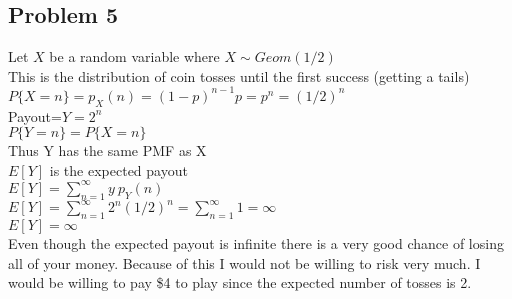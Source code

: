 \documentclass{article}
\begin{document}
\begin{flushleft}
\section*{Problem 5}
Let $X$ be a random variable where $X \sim Geom(1/2)$\\
This is the distribution of coin tosses until the first success (getting a tails)\\
$P\{X=n\}=p_X(n)=(1-p)^{n-1}p=p^n=(1/2)^n$\\
Payout=$Y=2^n$\\
$P\{Y=n\}=P\{X=n\}$\\
Thus Y has the same PMF as X\\
$E[Y]$ is the expected payout\\
$E[Y]=\sum_{n=1}^{\infty}y \ p_Y(n)$ \\ $E[Y]=\sum_{n=1}^{\infty}2^n(1/2)^n=\sum_{n=1}^{\infty}1
=\infty$\\
$E[Y]=\infty$\\
Even though the expected payout is infinite there is a very good chance of losing all of your money. Because of this I would not be willing to risk very much. I would be willing to pay \$4 to play since the expected number of tosses is 2.
\pagebreak

\end{flushleft}
\end{document}
